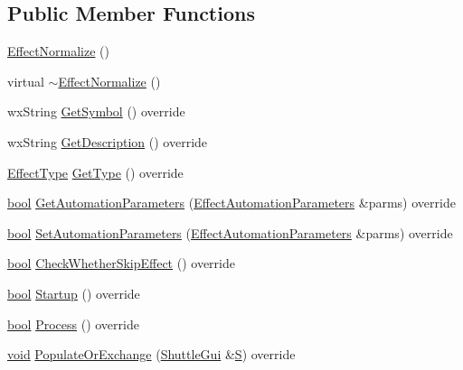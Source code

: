\subsection*{Public Member Functions}
\begin{DoxyCompactItemize}
\item 
\hyperlink{class_effect_normalize_aee4f0d761a1962c58a69dc801d258fb5}{Effect\+Normalize} ()
\item 
virtual \hyperlink{class_effect_normalize_a93cfb2295691432f50b9fb098ca8e9ed}{$\sim$\+Effect\+Normalize} ()
\item 
wx\+String \hyperlink{class_effect_normalize_a68b6d7a7799cee6580b854a959f0c34b}{Get\+Symbol} () override
\item 
wx\+String \hyperlink{class_effect_normalize_a8be064073eb80b72aa7a318904035e67}{Get\+Description} () override
\item 
\hyperlink{_effect_interface_8h_a4809a7bb3fd1a421902a667cc1405d43}{Effect\+Type} \hyperlink{class_effect_normalize_a3b8b32222c8215c2bcf81c768b5982a7}{Get\+Type} () override
\item 
\hyperlink{mac_2config_2i386_2lib-src_2libsoxr_2soxr-config_8h_abb452686968e48b67397da5f97445f5b}{bool} \hyperlink{class_effect_normalize_ae02515927cffe137c796d866759cf106}{Get\+Automation\+Parameters} (\hyperlink{class_effect_automation_parameters}{Effect\+Automation\+Parameters} \&parms) override
\item 
\hyperlink{mac_2config_2i386_2lib-src_2libsoxr_2soxr-config_8h_abb452686968e48b67397da5f97445f5b}{bool} \hyperlink{class_effect_normalize_a1cdd919079ee442cd1a5e8d574e7dc46}{Set\+Automation\+Parameters} (\hyperlink{class_effect_automation_parameters}{Effect\+Automation\+Parameters} \&parms) override
\item 
\hyperlink{mac_2config_2i386_2lib-src_2libsoxr_2soxr-config_8h_abb452686968e48b67397da5f97445f5b}{bool} \hyperlink{class_effect_normalize_aa083faa529f36ec18617e3efbe12a6dd}{Check\+Whether\+Skip\+Effect} () override
\item 
\hyperlink{mac_2config_2i386_2lib-src_2libsoxr_2soxr-config_8h_abb452686968e48b67397da5f97445f5b}{bool} \hyperlink{class_effect_normalize_a2aa8434536039bbf430718581dede568}{Startup} () override
\item 
\hyperlink{mac_2config_2i386_2lib-src_2libsoxr_2soxr-config_8h_abb452686968e48b67397da5f97445f5b}{bool} \hyperlink{class_effect_normalize_a49acc5abf9bea616de61a2af19917bba}{Process} () override
\item 
\hyperlink{sound_8c_ae35f5844602719cf66324f4de2a658b3}{void} \hyperlink{class_effect_normalize_a82e7b2c670d24003bd3666956a96ea05}{Populate\+Or\+Exchange} (\hyperlink{class_shuttle_gui}{Shuttle\+Gui} \&\hyperlink{xlftab_8c_af933676109efed7ab34cea71d748a517}{S}) override

\end{DoxyCompactItemize}
